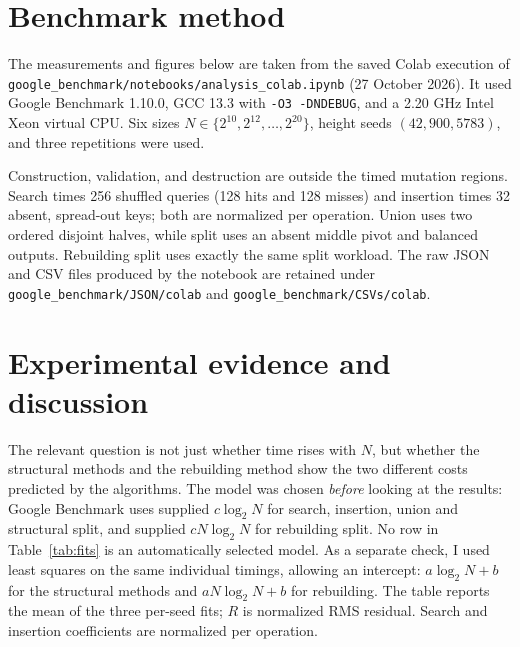 \documentclass[10pt,a4paper]{article}
\newcommand{\code}[1]{\texttt{#1}}
\begin{document}
\section*{Benchmark method}
The measurements and figures below are taken from the saved Colab execution of
\code{google\_benchmark/notebooks/analysis\_colab.ipynb} (27 October 2026).
It used Google Benchmark 1.10.0, GCC 13.3 with \code{-O3 -DNDEBUG}, and a
2.20 GHz Intel Xeon virtual CPU.  Six sizes
\(N\in\{2^{10},2^{12},\ldots,2^{20}\}\), height seeds
\((42,900,5783)\), and three repetitions were used.

Construction, validation, and destruction are outside the timed mutation
regions.  Search times 256 shuffled queries (128 hits and 128 misses) and
insertion times 32 absent, spread-out keys; both are normalized per operation.
Union uses two ordered disjoint halves, while split uses an absent middle pivot
and balanced outputs.  Rebuilding split uses exactly the same split workload.
The raw JSON and CSV files produced by the notebook are retained under
\code{google\_benchmark/JSON/colab} and \code{google\_benchmark/CSVs/colab}.

\section*{Experimental evidence and discussion}
The relevant question is not just whether time rises with \(N\), but whether
the structural methods and the rebuilding method show the two different costs
predicted by the algorithms.  The model was chosen \emph{before} looking at the
results: Google Benchmark uses supplied \(c\log_2N\) for search, insertion,
union and structural split, and supplied \(cN\log_2N\) for rebuilding split.
No row in Table~\ref{tab:fits} is an automatically selected model.  As a
separate check, I used least squares on the same individual timings, allowing
an intercept: \(a\log_2N+b\) for the structural methods and
\(aN\log_2N+b\) for rebuilding.  The table reports the mean of the three
per-seed fits; \(R\) is normalized RMS residual.  Search and insertion
coefficients are normalized per operation.
\end{document}

